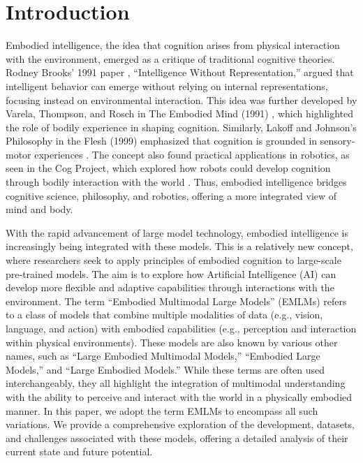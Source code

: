 \section{Introduction}
\label{sec:intro}

Embodied intelligence, the idea that cognition arises from physical interaction with the environment, emerged as a critique of traditional cognitive theories. Rodney Brooks' 1991 paper \cite{brooks1991intelligence}, ``Intelligence Without Representation,'' argued that intelligent behavior can emerge without relying on internal representations, focusing instead on environmental interaction. This idea was further developed by Varela, Thompson, and Rosch in The Embodied Mind (1991) \cite{varela2017embodied}, which highlighted the role of bodily experience in shaping cognition. Similarly, Lakoff and Johnson's Philosophy in the Flesh (1999) emphasized that cognition is grounded in sensory-motor experiences \cite{lakoff1999review}. The concept also found practical applications in robotics, as seen in the Cog Project, which explored how robots could develop cognition through bodily interaction with the world \cite{brooks1998cog}. Thus, embodied intelligence bridges cognitive science, philosophy, and robotics, offering a more integrated view of mind and body.

With the rapid advancement of large model technology, embodied intelligence is increasingly being integrated with these models. This is a relatively new concept, where researchers seek to apply principles of embodied cognition to large-scale pre-trained models. The aim is to explore how Artificial Intelligence (AI) can develop more flexible and adaptive capabilities through interactions with the environment. The term ``Embodied Multimodal Large Models'' (EMLMs) refers to a class of models that combine multiple modalities of data (e.g., vision, language, and action) with embodied capabilities (e.g., perception and interaction within physical environments). These models are also known by various other names, such as ``Large Embodied Multimodal Models,'' ``Embodied Large Models,'' and ``Large Embodied Models.'' While these terms are often used interchangeably, they all highlight the integration of multimodal understanding with the ability to perceive and interact with the world in a physically embodied manner. In this paper, we adopt the term EMLMs to encompass all such variations. We provide a comprehensive exploration of the development, datasets, and challenges associated with these models, offering a detailed analysis of their current state and future potential.

